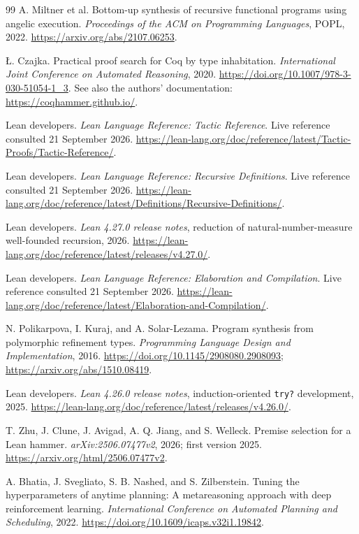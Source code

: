 \documentclass[11pt,a4paper]{article}
\newcommand{\code}[1]{\nolinkurl{#1}}
\theoremstyle{remark}
\begin{document}
\begin{thebibliography}{99}
 A. Miltner et al.
Bottom-up synthesis of recursive functional programs using angelic execution.
\emph{Proceedings of the ACM on Programming Languages}, POPL, 2022.
\url{https://arxiv.org/abs/2107.06253}.

 \L. Czajka.
Practical proof search for Coq by type inhabitation.
\emph{International Joint Conference on Automated Reasoning}, 2020.
\url{https://doi.org/10.1007/978-3-030-51054-1_3}.
See also the authors' documentation: \url{https://coqhammer.github.io/}.

 Lean developers.
\emph{Lean Language Reference: Tactic Reference}. Live reference consulted 21 September 2026.
\url{https://lean-lang.org/doc/reference/latest/Tactic-Proofs/Tactic-Reference/}.

 Lean developers.
\emph{Lean Language Reference: Recursive Definitions}. Live reference consulted 21 September 2026.
\url{https://lean-lang.org/doc/reference/latest/Definitions/Recursive-Definitions/}.

 Lean developers.
\emph{Lean 4.27.0 release notes}, reduction of natural-number-measure well-founded recursion, 2026.
\url{https://lean-lang.org/doc/reference/latest/releases/v4.27.0/}.

 Lean developers.
\emph{Lean Language Reference: Elaboration and Compilation}. Live reference consulted 21 September 2026.
\url{https://lean-lang.org/doc/reference/latest/Elaboration-and-Compilation/}.

 N. Polikarpova, I. Kuraj, and A. Solar-Lezama.
Program synthesis from polymorphic refinement types.
\emph{Programming Language Design and Implementation}, 2016.
\url{https://doi.org/10.1145/2908080.2908093};
\url{https://arxiv.org/abs/1510.08419}.

 Lean developers.
\emph{Lean 4.26.0 release notes}, induction-oriented \code{try?} development, 2025.
\url{https://lean-lang.org/doc/reference/latest/releases/v4.26.0/}.

 T. Zhu, J. Clune, J. Avigad, A. Q. Jiang, and S. Welleck.
Premise selection for a Lean hammer.
\emph{arXiv:2506.07477v2}, 2026; first version 2025.
\url{https://arxiv.org/html/2506.07477v2}.

 A. Bhatia, J. Svegliato, S. B. Nashed, and S. Zilberstein.
Tuning the hyperparameters of anytime planning: A metareasoning approach with deep reinforcement learning.
\emph{International Conference on Automated Planning and Scheduling}, 2022.
\url{https://doi.org/10.1609/icaps.v32i1.19842}.


\end{thebibliography}
\end{document}
